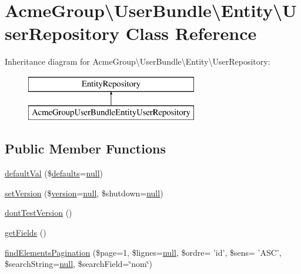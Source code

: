 \hypertarget{class_acme_group_1_1_user_bundle_1_1_entity_1_1_user_repository}{\section{Acme\+Group\textbackslash{}User\+Bundle\textbackslash{}Entity\textbackslash{}User\+Repository Class Reference}
\label{class_acme_group_1_1_user_bundle_1_1_entity_1_1_user_repository}
}
Inheritance diagram for Acme\+Group\textbackslash{}User\+Bundle\textbackslash{}Entity\textbackslash{}User\+Repository\+:\begin{figure}[H]
\begin{center}
\leavevmode
\includegraphics[height=2.000000cm]{class_acme_group_1_1_user_bundle_1_1_entity_1_1_user_repository}
\end{center}
\end{figure}
\subsection*{Public Member Functions}
\begin{DoxyCompactItemize}
\item 
\hyperlink{class_acme_group_1_1_user_bundle_1_1_entity_1_1_user_repository_ae5ec20ceafbbd5fd895eb35946b173ac}{default\+Val} (\$\hyperlink{model_8defaults_8js_a9114d742403a54e409eca2e2c78bff56}{defaults}=\hyperlink{validate_8js_afb8e110345c45e74478894341ab6b28e}{null})
\item 
\hyperlink{class_acme_group_1_1_user_bundle_1_1_entity_1_1_user_repository_a8d40e6f3a388520fcc5b59170ec10491}{set\+Version} (\$\hyperlink{jquery-ui_8js_a8fa514f3aed7ddc8bfb00ed5aea5b5e2}{version}=\hyperlink{validate_8js_afb8e110345c45e74478894341ab6b28e}{null}, \$shutdown=\hyperlink{validate_8js_afb8e110345c45e74478894341ab6b28e}{null})
\item 
\hyperlink{class_acme_group_1_1_user_bundle_1_1_entity_1_1_user_repository_a7225f6a7ca1119cf2f998fb6c53d9aa7}{dont\+Test\+Version} ()
\item 
\hyperlink{class_acme_group_1_1_user_bundle_1_1_entity_1_1_user_repository_a614ea36521a793b2565b71410a8f4fe4}{get\+Fields} ()
\item 
\hyperlink{class_acme_group_1_1_user_bundle_1_1_entity_1_1_user_repository_ac241cc7bf40eae32fac86fa06f6634fc}{find\+Elements\+Pagination} (\$page=1, \$lignes=\hyperlink{validate_8js_afb8e110345c45e74478894341ab6b28e}{null}, \$ordre= 'id', \$sens= 'A\+S\+C', \$search\+String=\hyperlink{validate_8js_afb8e110345c45e74478894341ab6b28e}{null}, \$search\+Field=\char`\"{}nom\char`\"{})
\end{DoxyCompactItemize}
